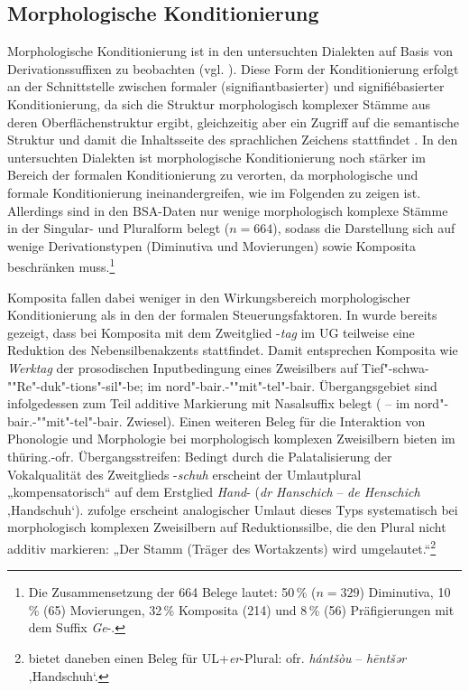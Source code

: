 \subsection{Morphologische Konditionierung}
\label{sec:8.3.4}
Morphologische Konditionierung ist in den untersuchten Dialekten auf Basis von Derivationssuffixen zu beobachten (vgl. \citealt[170]{Rowley1997}). Diese Form der Konditionierung erfolgt an der Schnittstelle zwischen formaler (signifiantbasierter) und signifiébasierter Konditionierung, da sich die Struktur morphologisch komplexer Stämme aus deren Oberflächenstruktur ergibt, gleichzeitig aber ein Zugriff auf die semantische Struktur und damit die Inhaltsseite des sprachlichen Zeichens stattfindet \citep[354--355]{Kürschner2008a}. In den untersuchten Dialekten ist morphologische Konditionierung noch stärker im Bereich der formalen Konditionierung zu verorten, da morphologische und formale Konditionierung ineinandergreifen, wie im Folgenden zu zeigen ist. Allerdings sind in den BSA-Daten nur wenige morphologisch komplexe Stämme in der Singular- und Pluralform belegt ($n=664$), sodass die Darstellung sich auf wenige Derivationstypen (Diminutiva und Movierungen) sowie Komposita beschränken muss.\footnote{Die Zusammensetzung der 664 Belege lautet: 50\,\% ($n=329$) Diminutiva, 10\,\% (65) Movierungen, 32\,\% Komposita (214) und 8\,\% (56) Präfigierungen mit dem Suffix \textit{Ge}{}-.}

\begin{sloppypar}
Komposita fallen dabei weniger in den Wirkungsbereich morphologischer Konditionierung als in den der formalen Steuerungsfaktoren. In  wurde bereits gezeigt, dass bei Komposita mit dem Zweitglied -\textit{tag} im UG teilweise eine Reduktion des Nebensilbenakzents stattfindet. Damit entsprechen Komposita wie \textit{Werktag} der prosodischen Inputbedingung eines Zweisilbers auf Tief"-schwa-""Re"-duk"-tions"-sil"-be; im nord"-bair.-""mit"-tel"-bair. Übergangsgebiet sind infolgedessen zum Teil additive Markierung mit Nasalsuffix belegt ( --  im nord"-bair.-""mit"-tel"-bair. Zwiesel). Einen weiteren Beleg für die Interaktion von Phonologie und Morphologie bei morphologisch komplexen Zweisilbern bieten \citet[148--149]{HarnischPetzold2000} im thüring.-ofr. Übergangsstreifen: Bedingt durch die Palatalisierung der Vokalqualität des Zweitglieds -\textit{schuh} erscheint der Umlautplural „kompensatorisch“ auf dem Erstglied \textit{Hand}{}- (\textit{dr Hanschich} -- \textit{de Henschich} ‚Handschuh‘). \citet[149]{HarnischPetzold2000} zufolge erscheint analogischer Umlaut dieses Typs systematisch bei morphologisch komplexen Zweisilbern auf Reduktionssilbe, die den Plural nicht additiv markieren: „Der Stamm (Träger des Wortakzents) wird umgelautet.“\footnote{\citet[§327b]{Gebhardt1907} bietet daneben einen Beleg für UL+\textit{er}{}-Plural: ofr. \textit{hántšòu} -- \textit{hēntšər} ‚Handschuh‘.}
\end{sloppypar}

